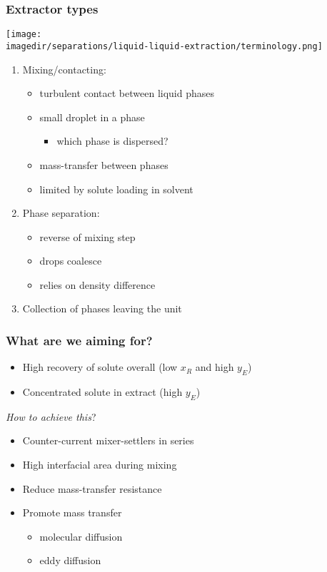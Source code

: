 \begin{frame}\frametitle{Extractor types}
	\begin{center}
		\texttt{[image: \\imagedir/separations/liquid-liquid-extraction/terminology.png]}
	\end{center}
	\begin{enumerate}
		\item	Mixing/contacting:
		 	\begin{itemize}
		 		\item	turbulent contact between liquid phases
		 		\item	small droplet {\color{purple}{dispersion}} in a {\color{purple}{continuous}} phase
				\begin{itemize}
					\item	which phase is dispersed?
				\end{itemize}
		 		\item	mass-transfer between phases
		 		\item	limited by solute loading in solvent
		 	\end{itemize}
		\item	Phase separation: 
			\begin{itemize}
				\item	reverse of mixing step
				\item	drops coalesce 
				\item	relies on density difference
			\end{itemize}
		\item	Collection of phases leaving the unit
	\end{enumerate}
\end{frame}

\begin{frame}\frametitle{What are we aiming for?}
	\begin{exampleblock}{{\color{myRed}{Main aims}}}
		\begin{itemize}
			\item	High recovery of solute overall (low $x_R$ and high $y_E$)
			\item	Concentrated solute in extract (high $y_E$)
		\end{itemize}
	\end{exampleblock}
	\vspace{12pt}
	\emph{How to achieve this}?
	\begin{itemize}
		\item	Counter-current mixer-settlers in series
		\item	High interfacial area during mixing
		\item	Reduce mass-transfer resistance
		\item	Promote mass transfer
		\begin{itemize}
			\item	molecular diffusion
			\item	eddy diffusion  \hfill {\color{myOrange}{$\leftarrow$ orders of magnitude greater}}
		\end{itemize}
	\end{itemize}
\end{frame}

